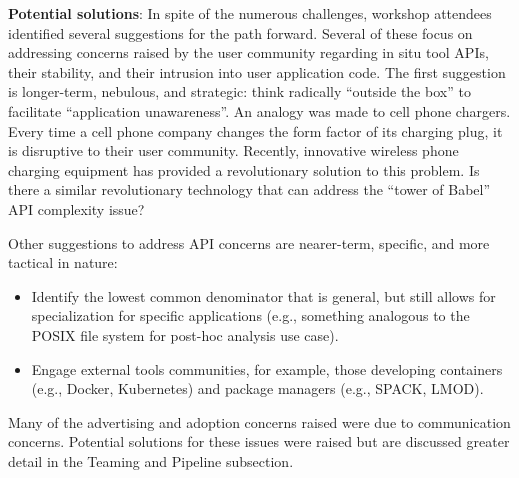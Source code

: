 \textbf{Potential solutions}: In spite of the numerous challenges, workshop attendees identified several suggestions for the path forward.  Several of these focus on addressing concerns raised by the user community regarding in situ tool APIs, their stability, and their intrusion into user application code.   The first suggestion is longer-term, nebulous, and strategic: think radically “outside the box” to facilitate “application unawareness”.  An analogy was made to cell phone chargers.  Every time a cell phone company changes the form factor of its charging plug, it is disruptive to their user community.  Recently, innovative wireless phone charging equipment has provided a revolutionary solution to this problem. Is there a similar revolutionary technology that can address the “tower of Babel” API complexity issue? 

Other suggestions to address API concerns are nearer-term, specific, and more tactical in nature:
\begin{itemize}
\item Identify the lowest common denominator that is general, but still allows for specialization for specific applications (e.g., something analogous to the POSIX file system for post-hoc analysis use case).  
\item Engage external tools communities, for example, those developing containers (e.g., Docker, Kubernetes)  and package managers (e.g., SPACK, LMOD). 
\end{itemize}

Many of the advertising and adoption concerns raised were due to communication concerns.  Potential solutions for these issues were raised but are discussed greater detail in the Teaming and Pipeline subsection.


